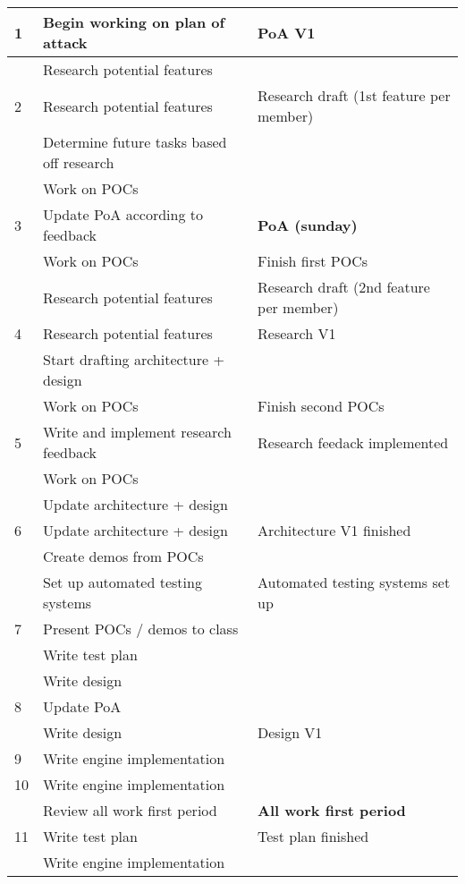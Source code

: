 \documentclass{article} %
\begin{document}
\begin{longtable}{|l|p{}|p{}|}
    1 & Begin working on plan of attack & PoA V1 \\ \hline
      & Research potential features & \\ \hline
    2 & Research potential features & Research draft (1st feature per member) \\ \hline
      & Determine future tasks based off research &  \\ \hline
      & Work on POCs & \\ \hline
    3 & Update PoA according to feedback &  \textbf{PoA (sunday)} \\ \hline
      & Work on POCs & Finish first POCs \\ \hline
      & Research potential features & Research draft (2nd feature per member) \\ \hline
    4 & Research potential features & Research V1 \\ \hline
      & Start drafting architecture + design &  \\ \hline
      & Work on POCs & Finish second POCs \\ \hline
    5 & Write and implement research feedback & Research feedack implemented \\ \hline
     & Work on POCs &  \\ \hline
      & Update architecture + design &  \\ \hline
    6 & Update architecture + design & Architecture V1 finished \\ \hline
      & Create demos from POCs & \\ \hline
      & Set up automated testing systems & Automated testing systems set up \\ \hline
    7 & Present POCs / demos to class &  \\ \hline
      & Write test plan & \\ \hline
      & Write design & \\ \hline
    8 & Update PoA &  \\ \hline
      & Write design & Design V1 \\ \hline
    9 & Write engine implementation &  \\ \hline
    10 & Write engine implementation &  \\ \hline
       & Review all work first period & \textbf{All work first period} \\ \hline
    11 & Write test plan & Test plan finished \\ \hline
       & Write engine implementation & \\ \hline

\end{longtable}
\end{document}
